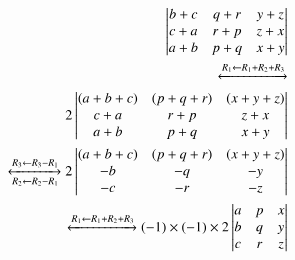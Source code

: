 
\begin{align}
\begin{vmatrix}b+c & q+r & y+z\\c+a & r+p & z+x\\a+b & p+q & x+y\end{vmatrix}\\ 
    \xleftrightarrow[]{R_1\leftarrow R_1+R_2+R_3}\\
    2 \begin{vmatrix}(a+b+c) & (p+q+r) & (x+y+z) \\c+a & r+p & z+x \\a+b & p+q & x+y\end{vmatrix}\\ 
    \xleftrightarrow[R_2 \leftarrow R_2-R_1]{R_3\leftarrow R_3-R_1}
    2 \begin{vmatrix}(a+b+c) & (p+q+r) & (x+y+z) \\-b & -q & -y \\-c & -r & -z\end{vmatrix}\\ \xleftrightarrow[]{R_1\leftarrow R_1+R_2+R_3}
    (-1)\times (-1)\times 2 \begin{vmatrix}a & p & x \\b & q & y \\c & r & z\end{vmatrix}
     \end{align}


